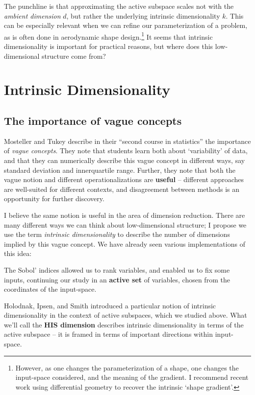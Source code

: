 \documentclass{article}
\begin{document}
The punchline is that approximating the active subspace scales not with the
\emph{ambient dimension} $d$, but rather the underlying intrinsic dimensionality
$k$. This can be especially relevant when we can refine our parameterization of
a problem, as is often done in aerodynamic shape
design.\cite{economon2016su2}\footnote{However, as one changes the
  parameterization of a shape, one changes the input-space considered, and the
  meaning of the gradient. I recommend recent work using differential geometry
  to recover the intrinsic `shape gradient'.\cite{grey2018characterizing}} It
seems that intrinsic dimensionality is important for practical reasons, but
where does this low-dimensional structure come from?

\section{Intrinsic Dimensionality}

\subsection{The importance of vague concepts}
Mosteller and Tukey\cite{mosteller1977data} describe in their ``second course in
statistics'' the importance of \emph{vague concepts}. They note that students
learn both about `variability' of data, and that they can numerically describe
this vague concept in different ways, say standard deviation and innerquartile
range. Further, they note that both the vague notion and different
operationalizations are \textbf{useful} -- different approaches are well-suited
for different contexts, and disagreement between methods is an opportunity for
further discovery.

I believe the same notion is useful in the area of dimension reduction. There
are many different ways we can think about low-dimensional structure; I propose
we use the term \emph{intrinsic dimensionality} to describe the number of
dimensions implied by this vague concept. We have already seen various
implementations of this idea:

\bigskip\noindent The Sobol' indices allowed us to rank variables, and enabled
us to fix some inputs, continuing our study in an \textbf{active set} of
variables, chosen from the coordinates of the input-space.

\bigskip\noindent Holodnak, Ipsen, and Smith introduced a particular notion of
intrinsic dimensionality in the context of active subspaces, which we studied
above. What we'll call the \textbf{HIS dimension} describes intrinsic
dimensionality in terms of the active subspace -- it is framed in terms of
important directions within input-space.
\end{document}
